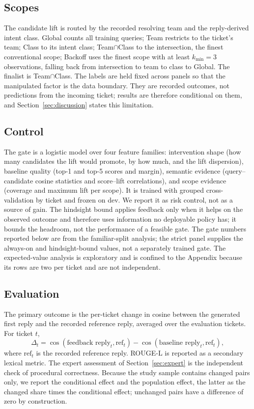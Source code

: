 \documentclass{ieeeaccess}
\begin{document}
\subsection{Scopes}
The candidate lift is routed by the recorded resolving team and the reply-derived
intent class. Global counts all training queries; Team restricts to the ticket's
team; Class to its intent class; Team$\cap$Class to the intersection, the finest
conventional scope; Backoff uses the finest scope with at least $k_{\min}=3$
observations, falling back from intersection to team to class to Global. The
finalist is Team$\cap$Class. The labels are held fixed across panels so that the
manipulated factor is the data boundary. They are recorded outcomes, not
predictions from the incoming ticket; results are therefore conditional on them,
and Section~\ref{sec:discussion} states this limitation.

\subsection{Control}
The gate is a logistic model over four feature families: intervention shape (how
many candidates the lift would promote, by how much, and the lift dispersion),
baseline quality (top-1 and top-5 scores and margin), semantic evidence
(query--candidate cosine statistics and score--lift correlations), and scope
evidence (coverage and maximum lift per scope). It is trained with grouped
cross-validation by ticket and frozen on dev. We report it as risk
control, not as a source of gain. The hindsight bound applies feedback only when it
helps on the observed outcome and therefore uses information no deployable policy
has; it bounds the headroom, not the performance of a feasible gate. The gate
numbers reported below are from the familiar-split analysis; the
strict panel supplies the always-on and hindsight-bound values, not a separately
trained gate. The expected-value analysis is exploratory and is confined to the
Appendix because its rows are two per ticket and are not independent.

\subsection{Evaluation}
The primary outcome is the per-ticket change in cosine between the generated first
reply and the recorded reference reply, averaged over the evaluation tickets. For
ticket $t$,
\begin{equation}
\Delta_t = \cos(\text{feedback reply}_t,\text{ref}_t)
           - \cos(\text{baseline reply}_t,\text{ref}_t),
\label{eq:delta}
\end{equation}
where $\text{ref}_t$ is the recorded reference reply. ROUGE-L \cite{b27} is
reported as a secondary lexical metric. The expert assessment of
Section~\ref{sec:expert} is the independent check of procedural correctness.
Because the study sample contains changed pairs only, we report the conditional
effect and the population effect, the latter as the changed share times the
conditional effect; unchanged pairs have a difference of zero by construction.
\end{document}
